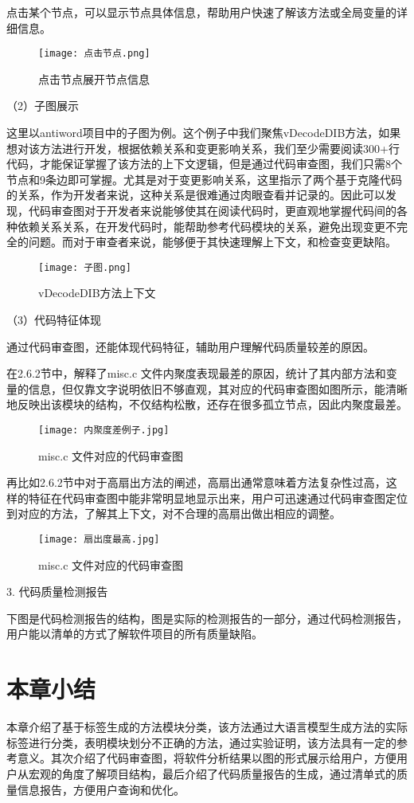点击某个节点，可以显示节点具体信息，帮助用户快速了解该方法或全局变量的详细信息。

\begin{figure}[h]
    \centering
    \texttt{[image: 点击节点.png]}
    \caption{点击节点展开节点信息}
    \end{figure}

（2）子图展示

这里以antiword项目中的子图为例。这个例子中我们聚焦vDecodeDIB方法，如果想对该方法进行开发，根据依赖关系和变更影响关系，我们至少需要阅读300+行代码，才能保证掌握了该方法的上下文逻辑，但是通过代码审查图，我们只需8个节点和9条边即可掌握。尤其是对于变更影响关系，这里指示了两个基于克隆代码的关系，作为开发者来说，这种关系是很难通过肉眼查看并记录的。因此可以发现，代码审查图对于开发者来说能够使其在阅读代码时，更直观地掌握代码间的各种依赖关系关系，在开发代码时，能帮助参考代码模块的关系，避免出现变更不完全的问题。而对于审查者来说，能够便于其快速理解上下文，和检查变更缺陷。

\begin{figure}[h]
    \centering
    \texttt{[image: 子图.png]}
    \caption{vDecodeDIB方法上下文}
    \end{figure}

（3）代码特征体现

通过代码审查图，还能体现代码特征，辅助用户理解代码质量较差的原因。

在2.6.2节中，解释了misc.c 文件内聚度表现最差的原因，统计了其内部方法和变量的信息，但仅靠文字说明依旧不够直观，其对应的代码审查图如图所示，能清晰地反映出该模块的结构，不仅结构松散，还存在很多孤立节点，因此内聚度最差。

\begin{figure}[h]
\centering
\texttt{[image: 内聚度差例子.jpg]}
\caption{misc.c 文件对应的代码审查图}
\end{figure}

再比如2.6.2节中对于高扇出方法的阐述，高扇出通常意味着方法复杂性过高，这样的特征在代码审查图中能非常明显地显示出来，用户可迅速通过代码审查图定位到对应的方法，了解其上下文，对不合理的高扇出做出相应的调整。

\begin{figure}[h]
\centering
\texttt{[image: 扇出度最高.jpg]}
\caption{misc.c 文件对应的代码审查图}
\end{figure}


3. 代码质量检测报告

下图是代码检测报告的结构，图是实际的检测报告的一部分，通过代码检测报告，用户能以清单的方式了解软件项目的所有质量缺陷。



\section{本章小结}

本章介绍了基于标签生成的方法模块分类，该方法通过大语言模型生成方法的实际标签进行分类，表明模块划分不正确的方法，通过实验证明，该方法具有一定的参考意义。其次介绍了代码审查图，将软件分析结果以图的形式展示给用户，方便用户从宏观的角度了解项目结构，最后介绍了代码质量报告的生成，通过清单式的质量信息报告，方便用户查询和优化。





